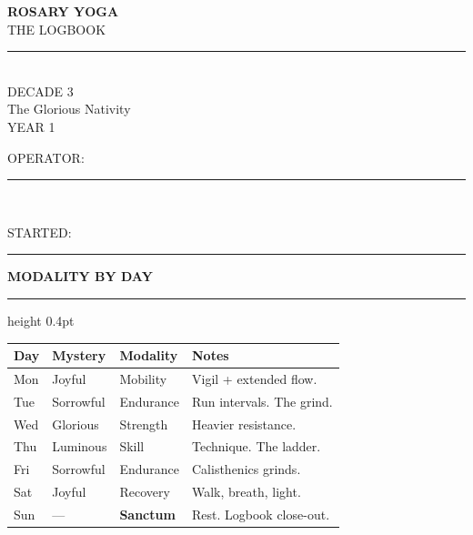 \documentclass[10pt]{article}
\newcommand{\YearNumber}{1}
\newcommand{\DecadeNumber}{3}
\newcommand{\DecadeName}{The Glorious}
\newcommand{\DecadeMystery}{Nativity}
\begin{document}
\thispagestyle{empty}
\vspace*{1.0in}
\begin{center}
  {\Huge\bfseries\sffamily ROSARY YOGA}\\[6pt]
  {\Large\sffamily THE LOGBOOK}\\[1.2in]
  \rule{2in}{0.5pt}\\[6pt]
  {\sffamily\large DECADE \DecadeNumber}\\[2pt]
  {\sffamily \DecadeName{} \textemdash{} \DecadeMystery}\\[1.0in]
  {\sffamily\small YEAR \YearNumber}\\[6pt]
  {\sffamily\small OPERATOR:~\rule[-2pt]{1.8in}{0.4pt}}\\[6pt]
  {\sffamily\small STARTED:~\rule[-2pt]{1.8in}{0.4pt}}
\end{center}
\newpage

{\sffamily\bfseries\small MODALITY BY DAY}\par
\vspace{4pt}\hrule height 0.4pt\vspace{6pt}
\begin{tabularx}{\linewidth}{@{}l l l X@{}}
\toprule
\textbf{Day} & \textbf{Mystery} & \textbf{Modality} & \textbf{Notes} \\
\midrule
Mon & Joyful    & Mobility   & Vigil + extended flow. \\
Tue & Sorrowful & Endurance  & Run intervals. The grind. \\
Wed & Glorious  & Strength   & Heavier resistance. \\
Thu & Luminous  & Skill      & Technique. The ladder. \\
Fri & Sorrowful & Endurance  & Calisthenics grinds. \\
Sat & Joyful    & Recovery   & Walk, breath, light. \\
Sun & ---       & \textbf{Sanctum} & Rest. Logbook close-out. \\
\bottomrule
\end{tabularx}
\end{document}
